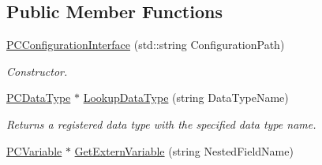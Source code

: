 \subsection*{Public Member Functions}
\begin{DoxyCompactItemize}
\item 
\hyperlink{classpc__emulator_1_1PCConfigurationInterface_a872d1e0ea21289f6fa9cf4936d9d800a}{P\+C\+Configuration\+Interface} (std\+::string Configuration\+Path)\hypertarget{classpc__emulator_1_1PCConfigurationInterface_a872d1e0ea21289f6fa9cf4936d9d800a}{}\label{classpc__emulator_1_1PCConfigurationInterface_a872d1e0ea21289f6fa9cf4936d9d800a}

\begin{DoxyCompactList}\small\item\em Constructor. \end{DoxyCompactList}\item 
\hyperlink{classpc__emulator_1_1PCDataType}{P\+C\+Data\+Type} $\ast$ \hyperlink{classpc__emulator_1_1PCConfigurationInterface_a702a13f4007cf4cde4544d5a1121ae09}{Lookup\+Data\+Type} (string Data\+Type\+Name)
\begin{DoxyCompactList}\small\item\em Returns a registered data type with the specified data type name. \end{DoxyCompactList}\item 
\hyperlink{classpc__emulator_1_1PCVariable}{P\+C\+Variable} $\ast$ \hyperlink{classpc__emulator_1_1PCConfigurationInterface_a050e5a47be4960325436968d29fb4d6d}{Get\+Extern\+Variable} (string Nested\+Field\+Name)\hypertarget{classpc__emulator_1_1PCConfigurationInterface_a050e5a47be4960325436968d29fb4d6d}{}\label{classpc__emulator_1_1PCConfigurationInterface_a050e5a47be4960325436968d29fb4d6d}


\end{DoxyCompactItemize}

